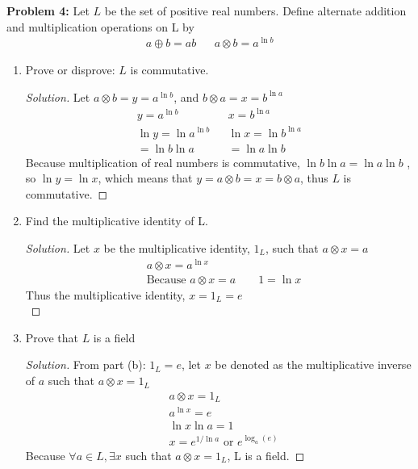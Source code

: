 \documentclass[12pt]{article}
\begin{document}
\newpage 
\noindent \textbf{Problem 4: } Let $L$ be the set of positive real numbers. Define alternate addition and multiplication operations on L by 
	\begin{align*}
		a \oplus b = ab && a \otimes b = a^{\ln b}
	\end{align*}
	\begin{enumerate}[label = (\alph*)]
		\item Prove or disprove: $L$ is commutative.
		\begin{proof}[Solution]
			Let $a \otimes b = y = a^{\ln b}$, and $b \otimes a = x = b^{\ln a}$
			\begin{align*}
				y = a^{\ln b} && x = b^{\ln a}\\
				\ln y = \ln a^{\ln b} && \ln x = \ln b ^{\ln a}\\
				= \ln b \ln a && = \ln a \ln b
			\end{align*}
			Because multiplication of real numbers is commutative, $\ln b \ln a = \ln a \ln b$ , so $\ln y = \ln x$, which means that $y = a \otimes b = x = b \otimes a$, thus $L$ is commutative.
		\end{proof}
		\item Find the multiplicative identity of L.
		\begin{proof}[Solution]
			Let $x$ be the multiplicative identity, $1_L$, such that $a \otimes x = a$
			\begin{align*}
				&a \otimes x = a^{\ln x} \\
				&\text{Because $a \otimes x = a$} \qquad 1 = \ln x 
			\end{align*}
			Thus the multiplicative identity, $x = 1_L = e$  \\
		\end{proof}
		\item Prove that $L$ is a field
		\begin{proof}[Solution]
			From part (b): $1_L = e$, let $x$ be denoted as the multiplicative inverse of $a$ such that $a \otimes x = 1_L$ 
			\begin{align*}
				&a \otimes x = 1_L \\
				&a ^ {\ln x} = e \\
				&\ln x \ln a = 1 \\
				&x = e^{1 / \ln a} \text{ or } e^{\log_a (e)}
			\end{align*}
			Because $\forall a \in L, \exists x$ such that $a \otimes x = 1_L$, L is a field.
		\end{proof}
	\end{enumerate}
\end{document}

